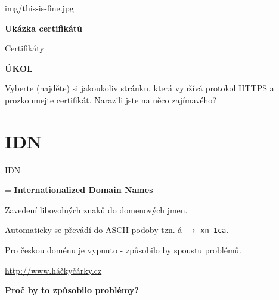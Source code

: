 \documentclass[aspectratio=169]{beamer}
\begin{document}
\begin{frameImg}{img/this-is-fine.jpg}
    \vspace*{60mm}
    \begin{cardTiny}
        \vspace*{\fill}
        \begin{center}
            \textbf{Ukázka certifikátů}
        \end{center}
    \end{cardTiny}
\end{frameImg}

\begin{frame}{Certifikáty}
    \begin{cardTiny}
        \begin{center}
            \textbf{ÚKOL}
        \end{center}
        \begin{flushleft}
            Vyberte (najděte) si jakoukoliv stránku, která využívá protokol HTTPS a prozkoumejte certifikát. Narazili jste na něco zajímavého?
        \end{flushleft}
    \end{cardTiny}
\end{frame}



\section{IDN}

\begin{frame}{IDN}
    \begin{cardTiny}
        \begin{flushleft}
            = \textbf{Internationalized Domain Names}

            Zavedení libovolných znaků do domenových jmen.

            Automaticky se převádí do ASCII podoby tzn. á $\rightarrow$ \texttt{xn--1ca}.

            Pro českou doménu je vypnuto - způsobilo by spoustu problémů.

            \href{https://xn--hkyrky-ptac70bc.cz}{http://www.háčkyčárky.cz}
        \end{flushleft}
    \end{cardTiny}
    \begin{cardTiny}
        \begin{center}
            \textbf{Proč by to způsobilo problémy?}
        \end{center}
    \end{cardTiny}
\end{frame}
\end{document}

